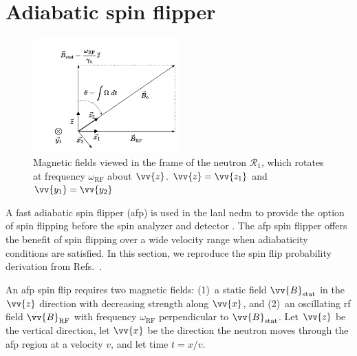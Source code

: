 
\section{Adiabatic spin flipper}\label{sec:afp}


\begin{figure}[htp]
    \centering
    \includegraphics[width=0.5\textwidth]{figures/adiabatic_spin_flip.pdf}
    \caption[{Magnetic fields viewed in the frame of the neutron $\mathcal{R}_1$, which rotates at frequency $\omega_\text{RF}$ about $\glsvv{z}$}]
            {Magnetic fields viewed in the frame of the neutron $\mathcal{R}_1$, which rotates at frequency $\omega_\text{RF}$ about $\vv{z}$. $\vv{z}=\vv{z_1}$ and $\vv{y_1}=\vv{y_2}$}
    \label{fig:adiabatic_spin_flip}
\end{figure}

A fast adiabatic spin flipper (\acrshort{afp}) is used in the \acrshort*{lanl} \acrshort*{nedm} to provide the option of spin flipping \ucn before the spin analyzer and detector \cite{holley_afp_2012}. The \acrshort*{afp} spin flipper offers the benefit of spin flipping \ucn over a wide velocity range when adiabaticity conditions are satisfied. In this section, we reproduce the spin flip probability derivation from Refs.~\cite{robiscoe_spin_flip, grigoriev_neutron_2001, rogel_thesis}.

An \acrshort*{afp} spin flip requires two magnetic fields: (1)~a static field $\vv{B}_\text{stat}$ in the $\vv{z}$ direction with decreasing strength along $\vv{x}$, and (2)~an oscillating \acrshort{rf} field $\vv{B}_\text{RF}$ with frequency $\omega_\text{RF}$ perpendicular to $\vv{B}_\text{stat}$. Let $\vv{z}$ be the vertical direction, let $\vv{x}$ be the direction the neutron moves through the \acrshort*{afp} region at a velocity $v$, and let time $t=x/v$.

